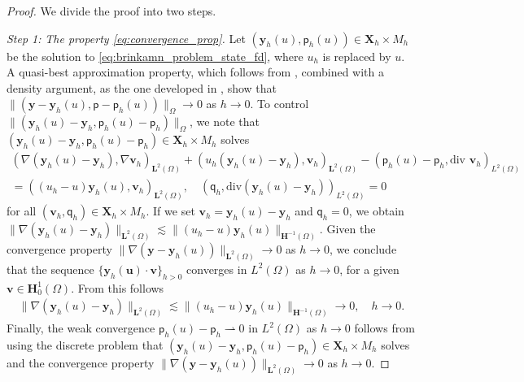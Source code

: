 \documentclass[final]{siamart0216}
\begin{document}
\begin{proof}

We divide the proof into two steps.

\emph{Step 1:} \emph{The property \eqref{eq:convergence_prop}.} Let $(\mathbf{y}_{h}(u),\mathsf{p}_h(u))\in \mathbf{X}_h \times M_h$ be the solution to \eqref{eq:brinkamn_problem_state_fd}, where $u_{h}$ is replaced by $u$. A quasi-best approximation property, which follows from \cite[Lemma 2.44]{Guermond-Ern}, combined with a density argument, as the one developed in \cite[Corollary 1.109]{Guermond-Ern}, show that
$
\|(\mathbf{y}-\mathbf{y}_{h}(u),\mathsf{p}-\mathsf{p}_h(u))\|_{\Omega}
\rightarrow 0
$
as 
$h \rightarrow 0$. To control $\|(\mathbf{y}_{h}(u)-\mathbf{y}_{h},\mathsf{p}_h(u)-\mathsf{p}_h)\|_{\Omega}$, we note that $(\mathbf{y}_{h}(u)-\mathbf{y}_{h},\mathsf{p}_{h}(u)-\mathsf{p}_{h}) \in \mathbf{X}_h \times M_h$ solves
\begin{multline*}
(\nabla (\mathbf{y}_h(u)-\mathbf{y}_h),\nabla \mathbf{v}_h)_{\mathbf{L}^2(\Omega)}
+
( u_h(\mathbf{y}_h(u)-\mathbf{y}_h), \mathbf{v}_h)_{\mathbf{L}^2(\Omega)}
-
(\mathsf{p}_h(u)-\mathsf{p}_h,\text{div }\mathbf{v}_h)_{L^2(\Omega)} \\=((u_{h}-u)\mathbf{y}_h(u),\mathbf{v}_h)_{\mathbf{L}^2(\Omega)},\quad (\mathsf{q}_h,\text{div}(\mathbf{y}_h(u)-\mathbf{y}_h))_{L^2(\Omega)}  =  0
\end{multline*}
for all $(\mathbf{v}_{h},\mathsf{q}_{h}) \in \mathbf{X}_h  \times M_h$. If we set $\mathbf{v}_{h}=\mathbf{y}_h(u)-\mathbf{y}_h$ and $\mathsf{q}_{h}=0$, we obtain $\|\nabla(\mathbf{y}_{h}(u)-\mathbf{y}_{h})\|_{\mathbf{L}^2(\Omega)} \lesssim \| (u_{h}-u)\mathbf{y}_h(u) \|_{\mathbf{H}^{-1}(\Omega)}$. Given the convergence property $ \| \nabla (\mathbf{y}-\mathbf{y}_{h}(u))\|_{\mathbf{L}^2(\Omega)} \rightarrow 0 $ as $h \rightarrow 0$, we conclude that the sequence $\{ \mathbf{y}_h (\mathbf{u}) \cdot \mathbf{v} \}_{h>0}$ converges in $L^2(\Omega)$ as $h \rightarrow 0$, for a given $\mathbf{v} \in \mathbf{H}_0^1(\Omega)$. From this follows
\begin{align*}
\|\nabla(\mathbf{y}_{h}(u)-\mathbf{y}_{h})\|_{\mathbf{L}^2(\Omega)} \lesssim \| (u_{h}-u)\mathbf{y}_h(u) \|_{\mathbf{H}^{-1}(\Omega)} \rightarrow 0,
\quad h \rightarrow 0.
\end{align*}
Finally, the weak convergence  $\mathsf{p}_h(u)-\mathsf{p}_h \rightharpoonup 0$ in $L^2(\Omega)$ as $h \rightarrow 0$ follows from using the discrete problem that $(\mathbf{y}_{h}(u)-\mathbf{y}_{h},\mathsf{p}_{h}(u)-\mathsf{p}_{h}) \in \mathbf{X}_h \times M_h$ solves 
and the convergence property $ \| \nabla (\mathbf{y}-\mathbf{y}_{h}(u))\|_{\mathbf{L}^2(\Omega)} \rightarrow 0 $ as 
$h \rightarrow 0$.


\end{proof}
\end{document}
